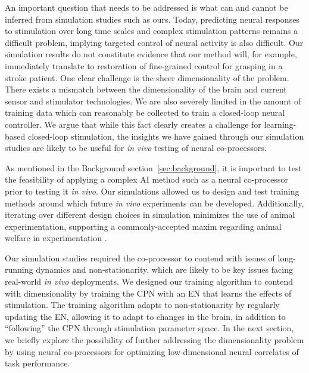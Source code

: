 \documentclass[12pt]{iopart}
\begin{document}
An important question that needs to be addressed is what can and cannot be inferred from simulation studies
such as ours. Today, predicting neural responses to stimulation over long time scales and complex stimulation
patterns remains a difficult problem, implying targeted control of neural activity is also difficult. Our
simulation results  do not constitute evidence that our method will, for example, immediately translate to
restoration of fine-grained control for grasping in a stroke patient. One clear challenge is the sheer
dimensionality of the problem. There exists a mismatch between the dimensionality of the brain and current
sensor and stimulator technologies. We are also severely limited in the amount of training data which can
reasonably be collected to train a closed-loop neural controller. We argue that while this fact clearly
creates a challenge for learning-based closed-loop stimulation, the insights we have gained through our
simulation studies are likely to be useful for {\em in vivo} testing of neural co-processors. 

As mentioned in the Background section~\ref{sec:background}, it is important to test 
the feasibility of applying a complex AI method such as a neural co-processor prior to testing it
\textit{in vivo}. Our simulations allowed us to design and test training methods around which
future \textit{in vivo} experiments can be developed. Additionally, iterating over different design
choices in simulation minimizes the use of animal experimentation, supporting a commonly-accepted
maxim regarding animal welfare in experimentation \cite{nrc.care}.

Our simulation studies required the co-processor to contend with issues of long-running dynamics and
non-stationarity, which are likely to be key issues facing real-world {\em in vivo} deployments. We designed
our training algorithm to contend with dimensionality by training the CPN with an EN that learns the effects
of stimulation. The training algorithm adapts to non-stationarity by regularly updating the EN, allowing it
to adapt to changes in the brain, in addition to ``following'' the CPN through stimulation parameter space.
In the next section, we briefly explore the possibility of further addressing the dimensionality problem by
using neural co-processors for optimizing low-dimensional neural correlates of task performance. 
\end{document}
